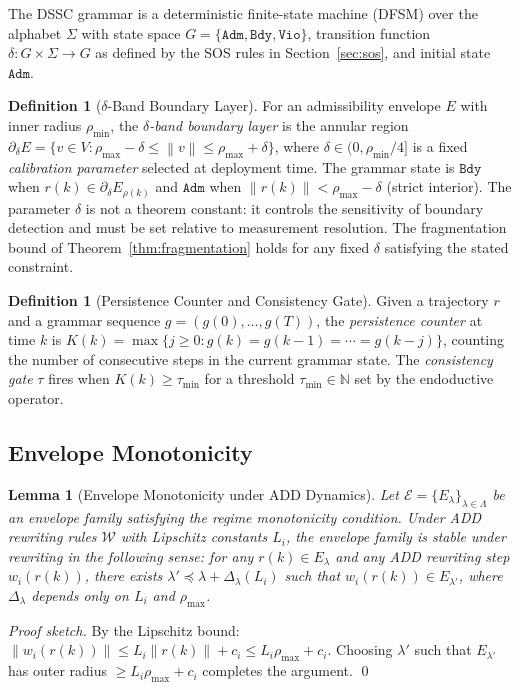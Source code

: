 \documentclass[11pt,a4paper]{article}
\theoremstyle{plain}
\newtheorem{lemma}[theorem]{Lemma}
\theoremstyle{definition}
\newtheorem{definition}[theorem]{Definition}
\theoremstyle{remark}
\newcommand{\N}{\mathbb{N}}
\newcommand{\norm}[1]{\left\|#1\right\|}
\begin{document}
The DSSC grammar is a deterministic finite-state machine (DFSM) over the alphabet $\Sigma$ with
state space $G = \{\mathtt{Adm}, \mathtt{Bdy}, \mathtt{Vio}\}$, transition function
$\delta : G \times \Sigma \to G$ as defined by the SOS rules in Section~\ref{sec:sos}, and initial
state $\mathtt{Adm}$.

\begin{definition}[$\delta$-Band Boundary Layer]
\label{def:delta_band}
  For an admissibility envelope $E$ with inner radius $\rho_{\min}$, the
  \emph{$\delta$-band boundary layer} is the annular region
  $\partial_\delta E = \{v \in V : \rho_{\max} - \delta \leq \norm{v} \leq \rho_{\max} + \delta\}$,
  where $\delta \in (0, \rho_{\min}/4]$ is a fixed \emph{calibration parameter} selected at
  deployment time. The grammar state is $\mathtt{Bdy}$ when $r(k) \in \partial_\delta E_{\rho(k)}$
  and $\mathtt{Adm}$ when $\norm{r(k)} < \rho_{\max} - \delta$ (strict interior).
  The parameter $\delta$ is not a theorem constant: it controls the sensitivity of boundary
  detection and must be set relative to measurement resolution. The fragmentation bound of
  Theorem~\ref{thm:fragmentation} holds for any fixed $\delta$ satisfying the stated constraint.
\end{definition}

\begin{definition}[Persistence Counter and Consistency Gate]
  Given a trajectory $r$ and a grammar sequence $g = (g(0), \ldots, g(T))$, the
  \emph{persistence counter} at time $k$ is
  $K(k) = \max\{j \geq 0 : g(k) = g(k-1) = \cdots = g(k-j)\}$,
  counting the number of consecutive steps in the current grammar state.
  The \emph{consistency gate} $\tau$ fires when $K(k) \geq \tau_{\min}$ for a threshold
  $\tau_{\min} \in \N$ set by the endoductive operator.
\end{definition}

\subsection{Envelope Monotonicity}

\begin{lemma}[Envelope Monotonicity under ADD Dynamics]
\label{lem:envelope_mono}
  Let $\mathcal{E} = \{E_\lambda\}_{\lambda \in \Lambda}$ be an envelope family satisfying the
  regime monotonicity condition. Under ADD rewriting rules $\mathcal{W}$ with Lipschitz constants
  $L_i$, the envelope family is stable under rewriting in the following sense: for any
  $r(k) \in E_\lambda$ and any ADD rewriting step $w_i(r(k))$, there exists
  $\lambda' \preceq \lambda + \Delta_\lambda(L_i)$ such that $w_i(r(k)) \in E_{\lambda'}$,
  where $\Delta_\lambda$ depends only on $L_i$ and $\rho_{\max}$.
\end{lemma}
\begin{proof}[Proof sketch]
  By the Lipschitz bound: $\norm{w_i(r(k))} \leq L_i \norm{r(k)} + c_i \leq L_i \rho_{\max} + c_i$.
  Choosing $\lambda'$ such that $E_{\lambda'}$ has outer radius $\geq L_i \rho_{\max} + c_i$
  completes the argument. \qed
\end{proof}
\end{document}
